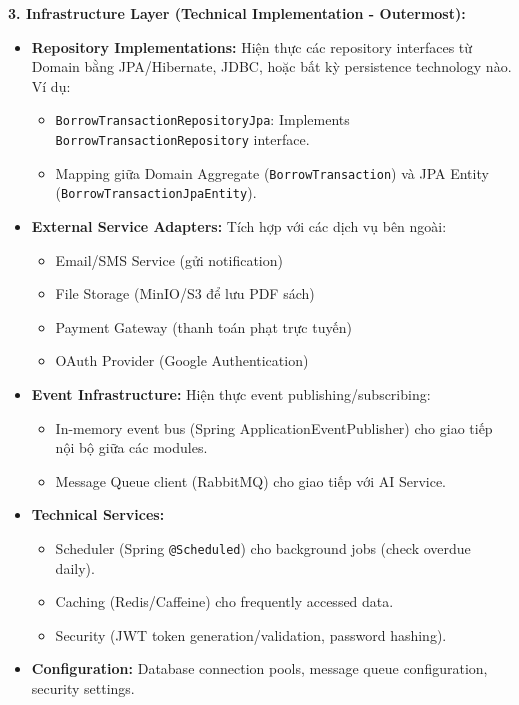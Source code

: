 \textbf{3. Infrastructure Layer (Technical Implementation - Outermost):}
\begin{itemize}
    \item \textbf{Repository Implementations:} Hiện thực các repository interfaces từ Domain bằng JPA/Hibernate, JDBC, hoặc bất kỳ persistence technology nào. Ví dụ:
    \begin{itemize}
        \item \texttt{BorrowTransactionRepositoryJpa}: Implements \texttt{BorrowTransactionRepository} interface.
        \item Mapping giữa Domain Aggregate (\texttt{BorrowTransaction}) và JPA Entity (\texttt{BorrowTransactionJpaEntity}).
    \end{itemize}
    
    \item \textbf{External Service Adapters:} Tích hợp với các dịch vụ bên ngoài:
    \begin{itemize}
        \item Email/SMS Service (gửi notification)
        \item File Storage (MinIO/S3 để lưu PDF sách)
        \item Payment Gateway (thanh toán phạt trực tuyến)
        \item OAuth Provider (Google Authentication)
    \end{itemize}
    
    \item \textbf{Event Infrastructure:} Hiện thực event publishing/subscribing:
    \begin{itemize}
        \item In-memory event bus (Spring ApplicationEventPublisher) cho giao tiếp nội bộ giữa các modules.
        \item Message Queue client (RabbitMQ) cho giao tiếp với AI Service.
    \end{itemize}
    
    \item \textbf{Technical Services:}
    \begin{itemize}
        \item Scheduler (Spring \texttt{@Scheduled}) cho background jobs (check overdue daily).
        \item Caching (Redis/Caffeine) cho frequently accessed data.
        \item Security (JWT token generation/validation, password hashing).
    \end{itemize}
    
    \item \textbf{Configuration:} Database connection pools, message queue configuration, security settings.
\end{itemize}


